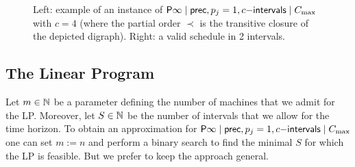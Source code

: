 \begin{figure}
\begin{center}
\caption{Left: example of an instance of $\mathsf{P} \infty \mid \mathsf{prec}, p_j=1, c\mathsf{-intervals} \mid C_{\max}$ with $c=4$ (where the partial order $\prec$ is the transitive closure of the depicted digraph). Right: a valid schedule in 2 intervals.\label{fig:ExamplePinftyIntervals}}  
\end{center}
\end{figure}



\subsection{The Linear Program}

Let $m \in \mathbb{N}$ be a parameter defining the number of machines that we admit for the LP.  
Moreover, let $S \in \mathbb{N}$ be the number of intervals that we allow for the time horizon.
To obtain an approximation for $\mathsf{P} \infty \mid \mathsf{prec}, p_j=1, c\mathsf{-intervals} \mid C_{\max}$  one can set $m := n$ and perform a binary
search to find the minimal $S$ for which the LP is feasible. But we prefer to keep the approach general.

